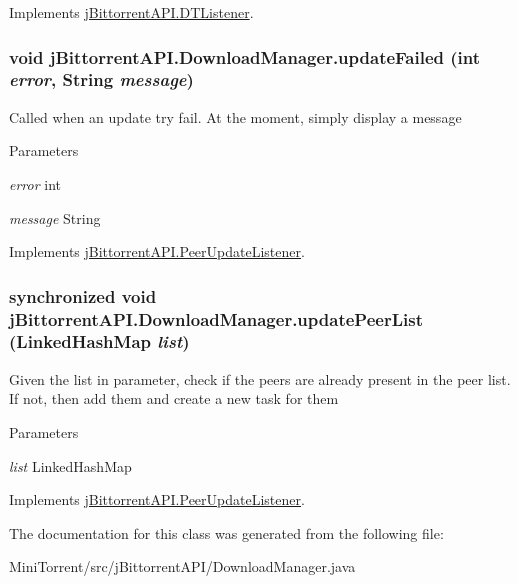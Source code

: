 Implements \hyperlink{interfacej_bittorrent_a_p_i_1_1_d_t_listener}{jBittorrentAPI.DTListener}.\hypertarget{classj_bittorrent_a_p_i_1_1_download_manager_a2c67828f0474dc0a8a104cb70ad676fb}{
\subsubsection[{updateFailed}]{\setlength{\rightskip}{0pt plus 5cm}void jBittorrentAPI.DownloadManager.updateFailed (int {\em error}, \/  String {\em message})}}
\label{classj_bittorrent_a_p_i_1_1_download_manager_a2c67828f0474dc0a8a104cb70ad676fb}
Called when an update try fail. At the moment, simply display a message 
\begin{DoxyParams}{Parameters}
\item[{\em error}]int \item[{\em message}]String \end{DoxyParams}


Implements \hyperlink{interfacej_bittorrent_a_p_i_1_1_peer_update_listener}{jBittorrentAPI.PeerUpdateListener}.\hypertarget{classj_bittorrent_a_p_i_1_1_download_manager_a04d9d710297689ef852f92f8b1407e33}{
\subsubsection[{updatePeerList}]{\setlength{\rightskip}{0pt plus 5cm}synchronized void jBittorrentAPI.DownloadManager.updatePeerList (LinkedHashMap {\em list})}}
\label{classj_bittorrent_a_p_i_1_1_download_manager_a04d9d710297689ef852f92f8b1407e33}
Given the list in parameter, check if the peers are already present in the peer list. If not, then add them and create a new task for them 
\begin{DoxyParams}{Parameters}
\item[{\em list}]LinkedHashMap \end{DoxyParams}


Implements \hyperlink{interfacej_bittorrent_a_p_i_1_1_peer_update_listener}{jBittorrentAPI.PeerUpdateListener}.

The documentation for this class was generated from the following file:\begin{DoxyCompactItemize}
\item 
MiniTorrent/src/jBittorrentAPI/DownloadManager.java\end{DoxyCompactItemize}
